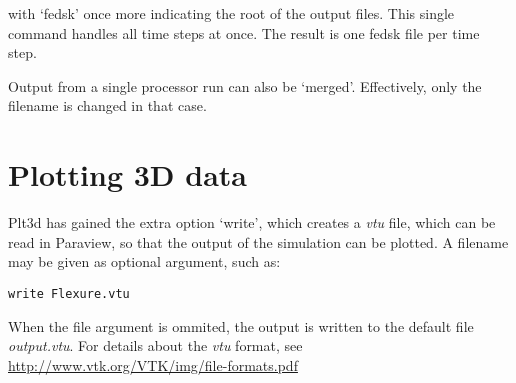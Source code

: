 \documentclass{article}
\begin{document}
with `fedsk' once more indicating the root of the output files.
This single command handles all time steps at once. The result is one fedsk file per time step.

Output from a single processor run can also be `merged'. Effectively, only the filename is changed in that case.


\section{Plotting 3D data}
Plt3d has gained the extra option `write', which creates a \textit{vtu} file, which can be read in Paraview,
so that the output of the simulation can be plotted. A filename may be given as optional argument, such as:

\begin{verbatim}
write Flexure.vtu
\end{verbatim}

When the file argument is ommited, the output is written to the default file \textit{output.vtu}.
For details about the \textit{vtu} format, see \url{http://www.vtk.org/VTK/img/file-formats.pdf}
\end{document}
